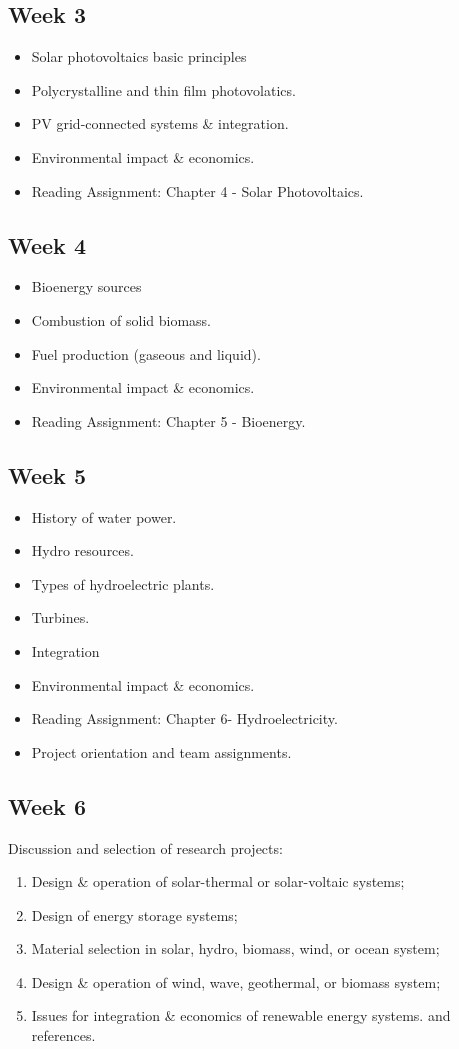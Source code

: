 \documentclass[11pt]{article}
\begin{document}
	\subsection*{Week 3}
	\begin{itemize}
\item Solar photovoltaics basic principles
	    \item Polycrystalline and thin film photovolatics.
	    \item PV grid-connected systems \& integration.
	    \item Environmental impact \& economics.
	    \item Reading Assignment: Chapter 4 - Solar Photovoltaics.
	\end{itemize}
		\subsection*{Week 4}
	\begin{itemize}
	  \item Bioenergy sources
	    \item Combustion of solid biomass.
	    \item Fuel production (gaseous and liquid).
	    \item Environmental impact \& economics.
	    \item Reading Assignment: Chapter 5 - Bioenergy.
	\end{itemize}
	\subsection*{Week 5}
	\begin{itemize}
	  \item History of water power.
	    \item Hydro resources.
	    \item Types of hydroelectric plants.
	    \item Turbines.
	    \item Integration 
	    \item Environmental impact \& economics.
	    \item Reading Assignment: Chapter 6- Hydroelectricity.
	    \item Project orientation and team assignments.
	\end{itemize}
	\subsection*{Week 6}
	Discussion and selection of research projects: 
	\begin{enumerate}
	    \item Design \& operation of solar-thermal or solar-voltaic systems; 
	    \item Design of energy storage systems; 
	    \item Material selection in solar, hydro, biomass, wind, or ocean system; 
	    \item Design \& operation of wind, wave, geothermal, or biomass system; 
	    \item Issues for integration \& economics of renewable energy systems.
	    and references.
	\end{enumerate} 
\end{document}
